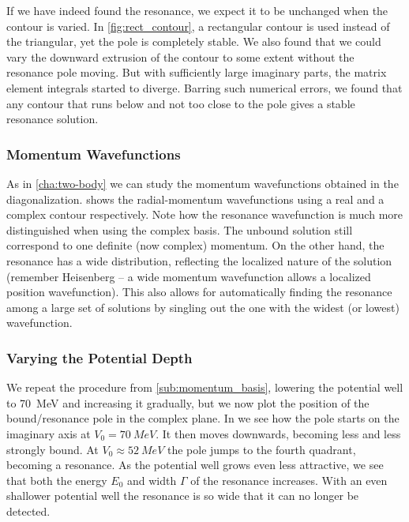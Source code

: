 \documentclass[../main/report.tex]{subfiles}
\begin{document}

If we have indeed found the resonance, we expect it to be unchanged when the contour is varied.
In \cref{fig:rect_contour}, a rectangular contour is used instead of the triangular, yet the pole is completely stable.
We also found that we could vary the downward extrusion of the contour to some extent without the resonance pole moving. 
But with sufficiently large imaginary parts, the matrix element integrals started to diverge.
Barring such numerical errors, we found that any contour that runs below and not too close to the pole gives a stable resonance solution.


\subsubsection{Momentum Wavefunctions}

As in \cref{cha:two-body} we can study the momentum wavefunctions obtained in the diagonalization.
 shows the radial-momentum wavefunctions using a real and a complex contour respectively.
Note how the resonance wavefunction is much more distinguished when using the complex basis.  
The unbound solution still correspond to one definite (now complex) momentum. 
On the other hand, the resonance has a wide distribution, reflecting the localized nature of the solution 
(remember Heisenberg -- a wide momentum wavefunction allows a localized position wavefunction). 
This also allows for automatically finding the resonance among a large set of solutions by singling out the one with the widest (or lowest) wavefunction.



\subsubsection{Varying the Potential Depth}
We repeat the procedure from \cref{sub:momentum_basis}, lowering the potential well to \SI{70}{MeV} and increasing it gradually, but we now plot the position of the bound/resonance pole in the complex plane.
In  we see how the pole starts on the imaginary axis at $V_0 = \SI{70}{MeV}$. 
It then moves downwards, becoming less and less strongly bound.
At $V_0 \approx \SI{52}{MeV}$ the pole jumps to the fourth quadrant, becoming a resonance.
As the potential well grows even less attractive, we see that both the energy $E_0$ and width $\Gamma$ of the resonance increases.
With an even shallower potential well the resonance is so wide that it can no longer be detected.
\end{document}
